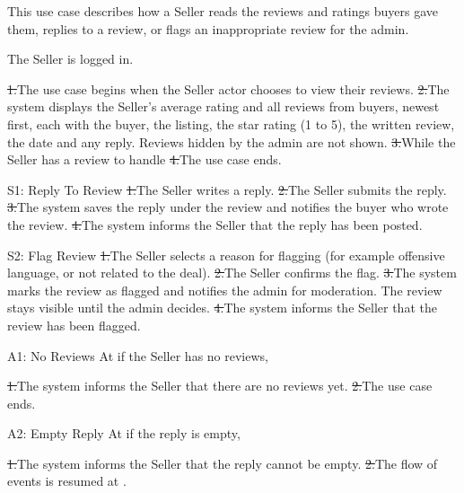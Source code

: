 This use case describes how a Seller reads the reviews and ratings buyers gave them, replies to a review, or flags an inappropriate review for the admin.\par
{}
The Seller is logged in.\par
{}
\st{1.}{The use case begins when the Seller actor chooses to view their reviews.}
\st{2.}{The system displays the Seller's average rating and all reviews from buyers, newest first, each with the buyer, the listing, the star rating (1 to 5), the written review, the date and any reply. Reviews hidden by the admin are not shown.}
\st{3.}{While the Seller has a review to handle}
\st{4.}{The use case ends.}
\begin{flowblock}{S1: Reply To Review}
\st{1.}{The Seller writes a reply.}
\st{2.}{The Seller submits the reply.}
\st{3.}{The system saves the reply under the review and notifies the buyer who wrote the review.}
\st{4.}{The system informs the Seller that the reply has been posted.}
\end{flowblock}
\begin{flowblock}{S2: Flag Review}
\st{1.}{The Seller selects a reason for flagging (for example offensive language, or not related to the deal).}
\st{2.}{The Seller confirms the flag.}
\st{3.}{The system marks the review as flagged and notifies the admin for moderation. The review stays visible until the admin decides.}
\st{4.}{The system informs the Seller that the review has been flagged.}
\end{flowblock}
\begin{flowblock}{A1: No Reviews}
At  if the Seller has no reviews,\par
\st{1.}{The system informs the Seller that there are no reviews yet.}
\st{2.}{The use case ends.}
\end{flowblock}
\begin{flowblock}{A2: Empty Reply}
At  if the reply is empty,\par
\st{1.}{The system informs the Seller that the reply cannot be empty.}
\st{2.}{The flow of events is resumed at .}
\end{flowblock}
